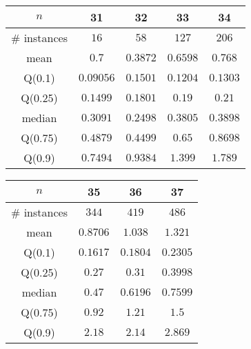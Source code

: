 \begin{tabular}{c|cccc} 
\hline 
$n$ & 31 & 32 & 33 & 34 \tabularnewline 
\hline 
\hline 
\# instances & $16$ & $58$ & $127$ & $206$ \tabularnewline 
mean & $0.7$ & $0.3872$ & $0.6598$ & $0.768$ \tabularnewline 
Q(0.1) & $0.09056$ & $0.1501$ & $0.1204$ & $0.1303$ \tabularnewline 
Q(0.25) & $0.1499$ & $0.1801$ & $0.19$ & $0.21$ \tabularnewline 
median & $0.3091$ & $0.2498$ & $0.3805$ & $0.3898$ \tabularnewline 
Q(0.75) & $0.4879$ & $0.4499$ & $0.65$ & $0.8698$ \tabularnewline 
Q(0.9) & $0.7494$ & $0.9384$ & $1.399$ & $1.789$ \tabularnewline 
\hline 
\end{tabular} 
\medskip{} 

\begin{tabular}{c|ccc} 
\hline 
$n$ & 35 & 36 & 37 \tabularnewline 
\hline 
\hline 
\# instances & $344$ & $419$ & $486$ \tabularnewline 
mean & $0.8706$ & $1.038$ & $1.321$ \tabularnewline 
Q(0.1) & $0.1617$ & $0.1804$ & $0.2305$ \tabularnewline 
Q(0.25) & $0.27$ & $0.31$ & $0.3998$ \tabularnewline 
median & $0.47$ & $0.6196$ & $0.7599$ \tabularnewline 
Q(0.75) & $0.92$ & $1.21$ & $1.5$ \tabularnewline 
Q(0.9) & $2.18$ & $2.14$ & $2.869$ \tabularnewline 
\hline 
\end{tabular} 
\medskip{} 

